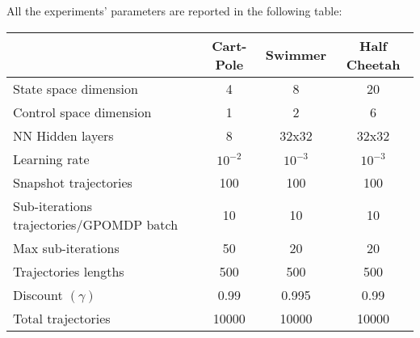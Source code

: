 \documentclass{article}
\theoremstyle{remark}
\theoremstyle{definition}
\begin{document}
All the experiments' parameters are reported in the following table:

\centering
\begin{tabular}{| l | c  c  c |}
	\hline	
	& Cart-Pole & Swimmer & Half Cheetah \\
	\hline
	State space dimension  & 4 & 8 & 20 \\
	Control space dimension & 1 & 2 & 6 \\
	NN Hidden layers & 8 & 32x32 & 32x32 \\
	Learning rate & $10^{-2}$ & $10^{-3}$ & $10^{-3}$ \\
	Snapshot trajectories & 100 & 100 & 100 \\
	Sub-iterations trajectories/GPOMDP batch & 10 & 10 & 10 \\
	Max sub-iterations & 50 & 20 & 20 \\
	Trajectories lengths& 500 & 500 & 500 \\
	Discount $(\gamma)$& 0.99 & 0.995 & 0.99 \\
	Total trajectories& 10000 & 10000 & 10000 \\
	\hline  
\end{tabular}
\end{document}

